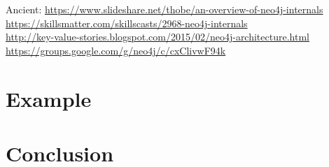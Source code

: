 \documentclass[a4paper,10pt]{article}
\begin{document}
Ancient: \href{Slides: Internals Of N4J}{https://www.slideshare.net/thobe/an-overview-of-neo4j-internals} \\
\href{Video}{https://skillsmatter.com/skillscasts/2968-neo4j-internals} \\

\href{N4J Arch blog}{http://key-value-stories.blogspot.com/2015/02/neo4j-architecture.html} \\

\href{Followup discussion w devs}{https://groups.google.com/g/neo4j/c/cxClivwF94k}

\section{Example}

\section{Conclusion}
\end{document}
